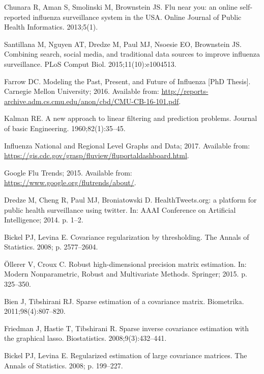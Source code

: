 \documentclass[10pt,letterpaper]{article}
\begin{document}
\begin{thebibliography}{10}
Chunara R, Aman S, Smolinski M, Brownstein JS.
\newblock Flu near you: an online self-reported influenza surveillance system
  in the USA.
\newblock Online Journal of Public Health Informatics. 2013;5(1).

Santillana M, Nguyen AT, Dredze M, Paul MJ, Nsoesie EO, Brownstein JS.
\newblock Combining search, social media, and traditional data sources to
  improve influenza surveillance.
\newblock PLoS Comput Biol. 2015;11(10):e1004513.

Farrow DC.
\newblock Modeling the Past, Present, and Future of Influenza [PhD Thesis].
\newblock Carnegie Mellon University; 2016.
\newblock Available from:
  \url{http://reports-archive.adm.cs.cmu.edu/anon/cbd/CMU-CB-16-101.pdf}.

Kalman RE.
\newblock A new approach to linear filtering and prediction problems.
\newblock Journal of basic Engineering. 1960;82(1):35--45.

Influenza National and Regional Level Graphs and Data; 2017.
\newblock Available from:
  \url{https://gis.cdc.gov/grasp/fluview/fluportaldashboard.html}.

Google Flu Trends; 2015.
\newblock Available from: \url{https://www.google.org/flutrends/about/}.

Dredze M, Cheng R, Paul MJ, Broniatowski D.
\newblock HealthTweets.org: a platform for public health surveillance using
  twitter.
\newblock In: AAAI Conference on Artificial Intelligence; 2014. p. 1--2.

Bickel PJ, Levina E.
\newblock Covariance regularization by thresholding.
\newblock The Annals of Statistics. 2008; p. 2577--2604.

{\"O}llerer V, Croux C.
\newblock Robust high-dimensional precision matrix estimation.
\newblock In: Modern Nonparametric, Robust and Multivariate Methods. Springer;
  2015. p. 325--350.

Bien J, Tibshirani RJ.
\newblock Sparse estimation of a covariance matrix.
\newblock Biometrika. 2011;98(4):807--820.

Friedman J, Hastie T, Tibshirani R.
\newblock Sparse inverse covariance estimation with the graphical lasso.
\newblock Biostatistics. 2008;9(3):432--441.

Bickel PJ, Levina E.
\newblock Regularized estimation of large covariance matrices.
\newblock The Annals of Statistics. 2008; p. 199--227.


\end{thebibliography}
\end{document}
